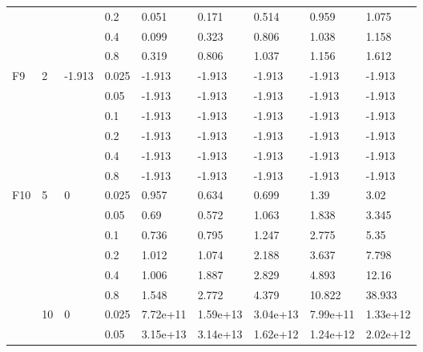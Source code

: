 \begin{longtable}{|l|l|l|l|l|l|l|l|l|}
\cmidrule{4-9} &     &          & 0.2            & 0.051      & 0.171      & 0.514      & 0.959      & 1.075      \\
\cmidrule{4-9} &     &          & 0.4            & 0.099      & 0.323      & 0.806      & 1.038      & 1.158      \\
\cmidrule{4-9} &     &          & 0.8            & 0.319      & 0.806      & 1.037      & 1.156      & 1.612      \\ \midrule
F9             & 2   & -1.913   & 0.025          & -1.913     & -1.913     & -1.913     & -1.913     & -1.913     \\
\cmidrule{4-9} &     &          & 0.05           & -1.913     & -1.913     & -1.913     & -1.913     & -1.913     \\
\cmidrule{4-9} &     &          & 0.1            & -1.913     & -1.913     & -1.913     & -1.913     & -1.913     \\
\cmidrule{4-9} &     &          & 0.2            & -1.913     & -1.913     & -1.913     & -1.913     & -1.913     \\
\cmidrule{4-9} &     &          & 0.4            & -1.913     & -1.913     & -1.913     & -1.913     & -1.913     \\
\cmidrule{4-9} &     &          & 0.8            & -1.913     & -1.913     & -1.913     & -1.913     & -1.913     \\ \midrule
F10            & 5   & 0        & 0.025          & 0.957      & 0.634      & 0.699      & 1.39       & 3.02       \\
\cmidrule{4-9} &     &          & 0.05           & 0.69       & 0.572      & 1.063      & 1.838      & 3.345      \\
\cmidrule{4-9} &     &          & 0.1            & 0.736      & 0.795      & 1.247      & 2.775      & 5.35       \\
\cmidrule{4-9} &     &          & 0.2            & 1.012      & 1.074      & 2.188      & 3.637      & 7.798      \\
\cmidrule{4-9} &     &          & 0.4            & 1.006      & 1.887      & 2.829      & 4.893      & 12.16      \\
\cmidrule{2-9} &     &          & 0.8            & 1.548      & 2.772      & 4.379      & 10.822     & 38.933     \\
\cmidrule{4-9} & 10  & 0        & 0.025          & 7.72e+11   & 1.59e+13   & 3.04e+13   & 7.99e+11   & 1.33e+12   \\
\cmidrule{4-9} &     &          & 0.05           & 3.15e+13   & 3.14e+13   & 1.62e+12   & 1.24e+12   & 2.02e+12   \\

\end{longtable}
